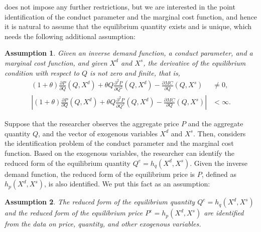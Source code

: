 \documentclass[11pt, a4paper]{article}
\newtheorem{assumption}{Assumption}
\theoremstyle{remark}
\begin{document}
\citet{lau1982identifying} does not impose any further restrictions, but we are interested in the point identification of the conduct parameter and the marginal cost function, and hence it is natural to assume that the equilibrium quantity exists and is unique, which needs the following additional assumption:
\begin{assumption}\label{assumption:unique_equilibrium}
    Given an inverse demand function, a conduct parameter, and a marginal cost function, and given $X^{d}$ and $X^{s}$, the derivative of the equilibrium condition with respect to $Q$ is not zero and finite, that is,
    \begin{align}
        (1+\theta)\frac{\partial P}{\partial Q}(Q, X^{d}) + \theta Q\frac{\partial^2 P}{\partial Q^2}(Q, X^{d}) - \frac{\partial MC}{\partial Q}(Q, X^{s}) & \ne 0,\\
        \left| (1+\theta)\frac{\partial P}{\partial Q}(Q, X^{d}) + \theta Q\frac{\partial^2 P}{\partial Q^2}(Q, X^{d}) - \frac{\partial MC}{\partial Q}(Q, X^{s})\right| &< \infty. 
    \end{align}
\end{assumption}


Suppose that the researcher observes the aggregate price $P$ and the aggregate quantity $Q$, and the vector of exogenous variables $X^{d}$ and $X^{s}$.
Then, \citet{lau1982identifying} considers the identification problem of the conduct parameter and the marginal cost function.
Based on the exogenous variables, the researcher can identify the reduced form of the equilibrium quantity $Q^e = h_q(X^{d}, X^{s})$.
Given the inverse demand function, the reduced form of the equilibrium price is $P$, defined as $h_p(X^{d}, X^{s})$, is also identified.
We put this fact as an assumption:
\begin{assumption}\label{assumption:reduced_form_identification}
    The reduced form of the equilibrium quantity $Q^e = h_q(X^{d}, X^{s})$ and the reduced form of the equilibrium price $P^e = h_p(X^{d}, X^{s})$ are identified from the data on price, quantity, and other exogenous variables.
\end{assumption}
\end{document}
